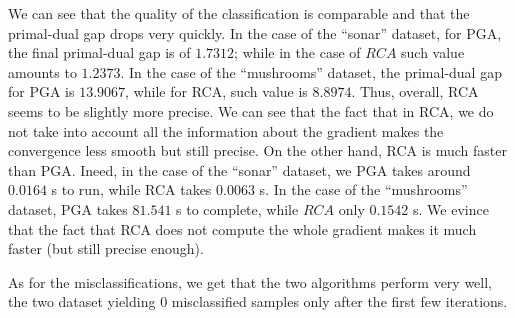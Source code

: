 \documentclass{article}
\begin{document}
\begin{itemize}
           We can see that the
           quality of the classification
           is comparable and that
           the primal-dual gap drops very quickly.
           In the case of the ``sonar'' dataset,
           for PGA, the final primal-dual gap is
           of $1.7312$; while in the case of
           $RCA$ such value amounts to
           $1.2373$.
           In the case of the ``mushrooms''
           dataset, the primal-dual gap 
           for PGA is $13.9067$, while
           for RCA, such value is 
           $8.8974$. Thus, overall,
           RCA seems to be slightly more precise.
           We can see that the fact that 
           in RCA, we do not take into account
           all the information about
           the gradient makes the convergence
           less smooth but still precise.
           On the other hand, RCA is much faster
           than PGA. Ineed, in the case
           of the ``sonar'' dataset,
           we PGA takes around $0.0164$ s to
           run, while RCA takes $0.0063$ s.
           In the case of the ``mushrooms''
           dataset, PGA takes $81.541$ s to 
           complete, while $RCA$ only $0.1542$ s.
           We evince that the fact that
           RCA does not compute the whole
           gradient makes it much faster
           (but still precise enough).

           As for the misclassifications,
           we get that the two algorithms
           perform very well, the two
           dataset yielding $0$ misclassified
           samples only after the first few iterations.


\end{itemize}
\end{document}
